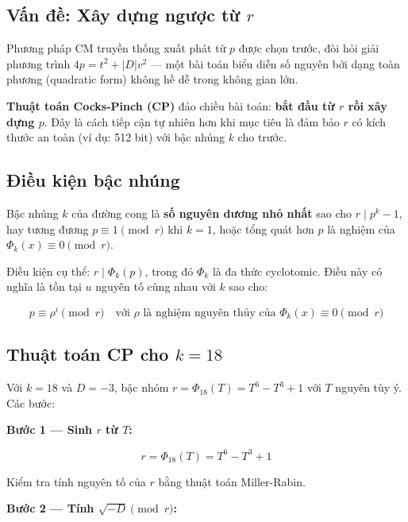 \subsection{\texorpdfstring{Vấn đề: Xây dựng ngược từ
\(r\)}{Vấn đề: Xây dựng ngược từ r}}\label{vux1ea5n-ux111ux1ec1-xuxe2y-dux1ef1ng-ngux1b0ux1ee3c-tux1eeb-r}

Phương pháp CM truyền thống xuất phát từ \(p\) được chọn trước, đòi hỏi
giải phương trình \(4p = t^2 + |D|v^2\) --- một bài toán biểu diễn số
nguyên bởi dạng toàn phương (quadratic form) không hề dễ trong không
gian lớn.

\textbf{Thuật toán Cocks-Pinch (CP)} \citep{CocksPinch2001} đảo chiều
bài toán: \textbf{bắt đầu từ \(r\) rồi xây dựng \(p\)}. Đây là cách tiếp
cận tự nhiên hơn khi mục tiêu là đảm bảo \(r\) có kích thước an toàn (ví
dụ: 512 bit) với bậc nhúng \(k\) cho trước.

\subsection{Điều kiện bậc
nhúng}\label{ux111iux1ec1u-kiux1ec7n-bux1eadc-nhuxfang}

Bậc nhúng \(k\) của đường cong là \textbf{số nguyên dương nhỏ nhất} sao
cho \(r \mid p^k - 1\), hay tương đương \(p \equiv 1 \pmod{r}\) khi
\(k=1\), hoặc tổng quát hơn \(p\) là nghiệm của
\(\Phi_k(x) \equiv 0 \pmod{r}\).

Điều kiện cụ thể: \(r \mid \Phi_k(p)\), trong đó \(\Phi_k\) là đa thức
cyclotomic. Điều này có nghĩa là tồn tại \(u\) nguyên tố cùng nhau với
\(k\) sao cho:

\[p \equiv \rho^i \pmod{r} \quad \text{với } \rho \text{ là nghiệm nguyên thủy của } \Phi_k(x) \equiv 0 \pmod{r}\]

\subsection{\texorpdfstring{Thuật toán CP cho
\(k = 18\)}{Thuật toán CP cho k = 18}}\label{thuux1eadt-touxe1n-cp-cho-k-18}

Với \(k = 18\) và \(D = -3\), bậc nhóm
\(r = \Phi_{18}(T) = T^6 - T^3 + 1\) với \(T\) nguyên tùy ý. Các bước:

\textbf{Bước 1 --- Sinh \(r\) từ \(T\):}

\[r = \Phi_{18}(T) = T^6 - T^3 + 1\]

Kiểm tra tính nguyên tố của \(r\) bằng thuật toán Miller-Rabin.

\textbf{Bước 2 --- Tính \(\sqrt{-D} \pmod{r}\):}

